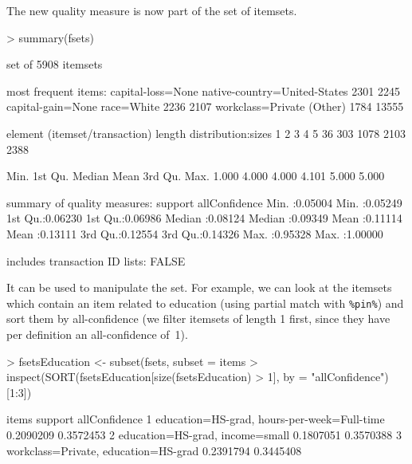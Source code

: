 \documentclass[10pt,a4paper]{article}
\newcommand{\code}[1]{\mbox{\texttt{#1}}}
\begin{document}
The new quality measure is now part of the set of itemsets.
\begin{Schunk}
\begin{Sinput}
> summary(fsets)
\end{Sinput}
\begin{Soutput}
set of 5908 itemsets

most frequent items:
           capital-loss=None native-country=United-States 
                        2301                         2245 
           capital-gain=None                   race=White 
                        2236                         2107 
           workclass=Private                      (Other) 
                        1784                        13555 

element (itemset/transaction) length distribution:sizes
   1    2    3    4    5 
  36  303 1078 2103 2388 

   Min. 1st Qu.  Median    Mean 3rd Qu.    Max. 
  1.000   4.000   4.000   4.101   5.000   5.000 

summary of quality measures:
    support        allConfidence    
 Min.   :0.05004   Min.   :0.05249  
 1st Qu.:0.06230   1st Qu.:0.06986  
 Median :0.08124   Median :0.09349  
 Mean   :0.11114   Mean   :0.13111  
 3rd Qu.:0.12554   3rd Qu.:0.14326  
 Max.   :0.95328   Max.   :1.00000  

includes transaction ID lists: FALSE 
\end{Soutput}
\end{Schunk}

It can be used to manipulate the set. For example, we can look at the
itemsets which contain an item related to education (using partial match with \code{\%pin\%}) and sort them by
all-confidence (we filter itemsets of length 1 first, since they have
per definition an all-confidence of~1).

\begin{Schunk}
\begin{Sinput}
> fsetsEducation <- subset(fsets, subset = items %
> inspect(SORT(fsetsEducation[size(fsetsEducation) > 1], by = "allConfidence")[1:3])
\end{Sinput}
\begin{Soutput}
  items                        support allConfidence
1 {education=HS-grad,                               
   hours-per-week=Full-time} 0.2090209     0.3572453
2 {education=HS-grad,                               
   income=small}             0.1807051     0.3570388
3 {workclass=Private,                               
   education=HS-grad}        0.2391794     0.3445408
\end{Soutput}
\end{Schunk}
\end{document}

